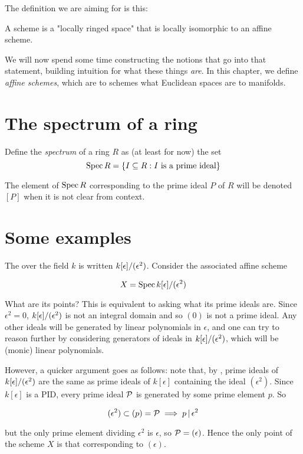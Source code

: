 \medskip\noindent The definition we are aiming for is this:

\begin{adefinition}[Target]
  A scheme is a "locally ringed space" that is locally isomorphic to an affine
  scheme.
\end{adefinition}

We will now spend some time constructing the notions that go into that
statement, building intuition for what these things \emph{are}. In this chapter,
we define \emph{affine schemes}, which are to schemes what Euclidean spaces are
to manifolds.

\section{The spectrum of a ring}%
\label{sec:the-spectrum-of-a-ring}

\begin{adefinition}[Provisional]
 Define the \emph{spectrum} of a ring $R$ as (at least for now) the set
\[ \operatorname{Spec} R = \{ I \subseteq R : I \text{ is a prime ideal} \} \]
\end{adefinition}

The element of $\operatorname{Spec} R$ corresponding to the prime ideal $P$ of $R$ will be
denoted $[P]$ when it is not clear from context.

\section{Some examples}
\label{sec:examples-of-affine-schemes}

\begin{example}
  The  over the field $k$ is written
  ${k}[\epsilon]/(\epsilon^2)$. Consider the associated affine scheme

  \[ X = \operatorname{Spec} {k}[\epsilon]/(\epsilon^2) \]

  \medskip\noindent What are its points? This is equivalent to asking what its
  prime ideals are. Since $\epsilon^2 = 0$, ${k}[\epsilon]/(\epsilon^2)$ is not an integral domain
  and so $(0)$ is not a prime ideal. Any other ideals will be generated by
  linear polynomials in $\epsilon$, and one can try to reason further by
  considering generators of ideals in ${k}[\epsilon]/(\epsilon^2)$, which will be (monic) linear
  polynomials.

  \medskip\noindent However, a quicker argument goes as follows: note that, by
  , prime ideals of ${k}[\epsilon]/(\epsilon^2)$
  are the same as prime ideals of $k[\epsilon]$ containing the ideal
  $(\epsilon^2)$. Since $k[\epsilon]$ is a PID, every prime ideal $\mathcal{P}$ is
  generated by some prime element $p$. So

  \[ (\epsilon^2) \subset (p) = \mathcal{P} \implies p \mathop{|} \epsilon^2 \]

  \medskip\noindent but the only prime element dividing $\epsilon^2$ is
  $\epsilon$, so $\mathcal{P} = (\epsilon)$. Hence the only point of the scheme $X$ is
  that corresponding to $(\epsilon)$.
\end{example}
